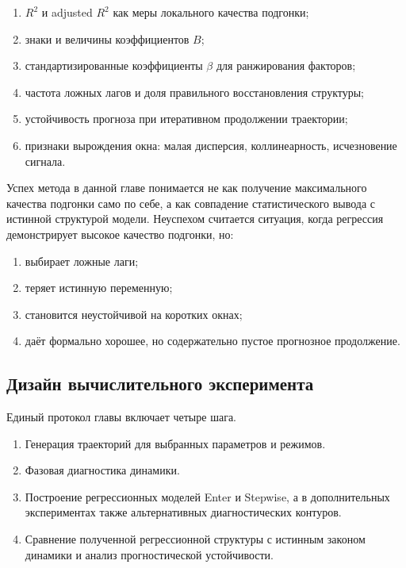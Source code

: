 \begin{enumerate}
\def\labelenumi{\arabic{enumi}.}
\tightlist
\item
  \(R^2\) и adjusted \(R^2\) как меры локального качества подгонки;
\item
  знаки и величины коэффициентов \(B\);
\item
  стандартизированные коэффициенты \(\beta\) для ранжирования факторов;
\item
  частота ложных лагов и доля правильного восстановления структуры;
\item
  устойчивость прогноза при итеративном продолжении траектории;
\item
  признаки вырождения окна: малая дисперсия, коллинеарность, исчезновение сигнала.
\end{enumerate}

Успех метода в данной главе понимается не как получение максимального качества подгонки само по себе, а как совпадение статистического вывода с истинной структурой модели. Неуспехом считается ситуация, когда регрессия демонстрирует высокое качество подгонки, но:

\begin{enumerate}
\def\labelenumi{\arabic{enumi}.}
\tightlist
\item
  выбирает ложные лаги;
\item
  теряет истинную переменную;
\item
  становится неустойчивой на коротких окнах;
\item
  даёт формально хорошее, но содержательно пустое прогнозное продолжение.
\end{enumerate}

\subsection{Дизайн вычислительного эксперимента}
\label{sec:dizain-vychislitelnogo-eksperimenta}

Единый протокол главы включает четыре шага.

\begin{enumerate}
\def\labelenumi{\arabic{enumi}.}
\tightlist
\item
  Генерация траекторий для выбранных параметров и режимов.
\item
  Фазовая диагностика динамики.
\item
  Построение регрессионных моделей Enter и Stepwise, а в дополнительных экспериментах также альтернативных диагностических контуров.
\item
  Сравнение полученной регрессионной структуры с истинным законом динамики и анализ прогностической устойчивости.
\end{enumerate}


